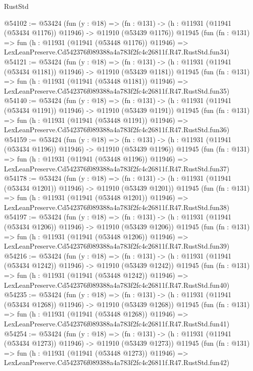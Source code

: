\begin{lexlean}{RustStd}
\begin{coremodule}
@54102 := @53424
    (fun (y : @18) =>
    (fn : @131) -> (h : @11931 (@11941 (@53434 @1176)) @11946) -> @11910 (@53439 @1176))
    @11945
    (fun (fn : @131) =>
    fun (h : @11931 (@11941 (@53448 @1176)) @11946) =>
    LexLeanPreserve.Cd542376f089388a4a783f2fc4c26811f.R47.RustStd.fun34)
@54121 := @53424
    (fun (y : @18) =>
    (fn : @131) -> (h : @11931 (@11941 (@53434 @1181)) @11946) -> @11910 (@53439 @1181))
    @11945
    (fun (fn : @131) =>
    fun (h : @11931 (@11941 (@53448 @1181)) @11946) =>
    LexLeanPreserve.Cd542376f089388a4a783f2fc4c26811f.R47.RustStd.fun35)
@54140 := @53424
    (fun (y : @18) =>
    (fn : @131) -> (h : @11931 (@11941 (@53434 @1191)) @11946) -> @11910 (@53439 @1191))
    @11945
    (fun (fn : @131) =>
    fun (h : @11931 (@11941 (@53448 @1191)) @11946) =>
    LexLeanPreserve.Cd542376f089388a4a783f2fc4c26811f.R47.RustStd.fun36)
@54159 := @53424
    (fun (y : @18) =>
    (fn : @131) -> (h : @11931 (@11941 (@53434 @1196)) @11946) -> @11910 (@53439 @1196))
    @11945
    (fun (fn : @131) =>
    fun (h : @11931 (@11941 (@53448 @1196)) @11946) =>
    LexLeanPreserve.Cd542376f089388a4a783f2fc4c26811f.R47.RustStd.fun37)
@54178 := @53424
    (fun (y : @18) =>
    (fn : @131) -> (h : @11931 (@11941 (@53434 @1201)) @11946) -> @11910 (@53439 @1201))
    @11945
    (fun (fn : @131) =>
    fun (h : @11931 (@11941 (@53448 @1201)) @11946) =>
    LexLeanPreserve.Cd542376f089388a4a783f2fc4c26811f.R47.RustStd.fun38)
@54197 := @53424
    (fun (y : @18) =>
    (fn : @131) -> (h : @11931 (@11941 (@53434 @1206)) @11946) -> @11910 (@53439 @1206))
    @11945
    (fun (fn : @131) =>
    fun (h : @11931 (@11941 (@53448 @1206)) @11946) =>
    LexLeanPreserve.Cd542376f089388a4a783f2fc4c26811f.R47.RustStd.fun39)
@54216 := @53424
    (fun (y : @18) =>
    (fn : @131) -> (h : @11931 (@11941 (@53434 @1242)) @11946) -> @11910 (@53439 @1242))
    @11945
    (fun (fn : @131) =>
    fun (h : @11931 (@11941 (@53448 @1242)) @11946) =>
    LexLeanPreserve.Cd542376f089388a4a783f2fc4c26811f.R47.RustStd.fun40)
@54235 := @53424
    (fun (y : @18) =>
    (fn : @131) -> (h : @11931 (@11941 (@53434 @1268)) @11946) -> @11910 (@53439 @1268))
    @11945
    (fun (fn : @131) =>
    fun (h : @11931 (@11941 (@53448 @1268)) @11946) =>
    LexLeanPreserve.Cd542376f089388a4a783f2fc4c26811f.R47.RustStd.fun41)
@54254 := @53424
    (fun (y : @18) =>
    (fn : @131) -> (h : @11931 (@11941 (@53434 @1273)) @11946) -> @11910 (@53439 @1273))
    @11945
    (fun (fn : @131) =>
    fun (h : @11931 (@11941 (@53448 @1273)) @11946) =>
    LexLeanPreserve.Cd542376f089388a4a783f2fc4c26811f.R47.RustStd.fun42)

\end{coremodule}
\end{lexlean}
